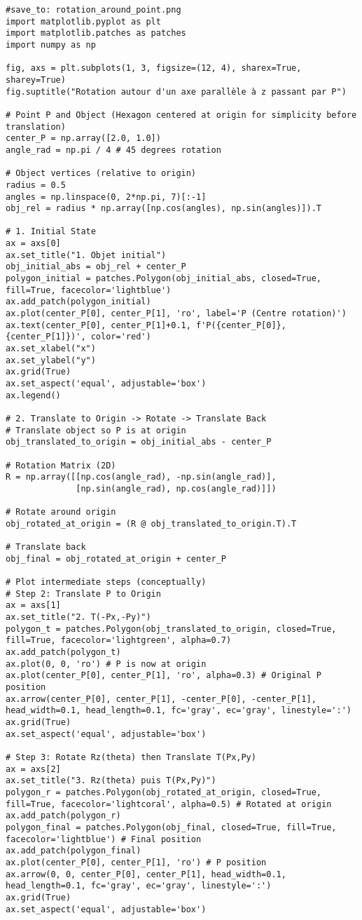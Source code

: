 \documentclass{article}
\begin{document}
\begin{verbatim}
#save_to: rotation_around_point.png
import matplotlib.pyplot as plt
import matplotlib.patches as patches
import numpy as np

fig, axs = plt.subplots(1, 3, figsize=(12, 4), sharex=True, sharey=True)
fig.suptitle("Rotation autour d'un axe parallèle à z passant par P")

# Point P and Object (Hexagon centered at origin for simplicity before translation)
center_P = np.array([2.0, 1.0])
angle_rad = np.pi / 4 # 45 degrees rotation

# Object vertices (relative to origin)
radius = 0.5
angles = np.linspace(0, 2*np.pi, 7)[:-1]
obj_rel = radius * np.array([np.cos(angles), np.sin(angles)]).T

# 1. Initial State
ax = axs[0]
ax.set_title("1. Objet initial")
obj_initial_abs = obj_rel + center_P
polygon_initial = patches.Polygon(obj_initial_abs, closed=True, fill=True, facecolor='lightblue')
ax.add_patch(polygon_initial)
ax.plot(center_P[0], center_P[1], 'ro', label='P (Centre rotation)')
ax.text(center_P[0], center_P[1]+0.1, f'P({center_P[0]},{center_P[1]})', color='red')
ax.set_xlabel("x")
ax.set_ylabel("y")
ax.grid(True)
ax.set_aspect('equal', adjustable='box')
ax.legend()

# 2. Translate to Origin -> Rotate -> Translate Back
# Translate object so P is at origin
obj_translated_to_origin = obj_initial_abs - center_P

# Rotation Matrix (2D)
R = np.array([[np.cos(angle_rad), -np.sin(angle_rad)],
              [np.sin(angle_rad), np.cos(angle_rad)]])

# Rotate around origin
obj_rotated_at_origin = (R @ obj_translated_to_origin.T).T

# Translate back
obj_final = obj_rotated_at_origin + center_P

# Plot intermediate steps (conceptually)
# Step 2: Translate P to Origin
ax = axs[1]
ax.set_title("2. T(-Px,-Py)")
polygon_t = patches.Polygon(obj_translated_to_origin, closed=True, fill=True, facecolor='lightgreen', alpha=0.7)
ax.add_patch(polygon_t)
ax.plot(0, 0, 'ro') # P is now at origin
ax.plot(center_P[0], center_P[1], 'ro', alpha=0.3) # Original P position
ax.arrow(center_P[0], center_P[1], -center_P[0], -center_P[1], head_width=0.1, head_length=0.1, fc='gray', ec='gray', linestyle=':')
ax.grid(True)
ax.set_aspect('equal', adjustable='box')

# Step 3: Rotate Rz(theta) then Translate T(Px,Py)
ax = axs[2]
ax.set_title("3. Rz(theta) puis T(Px,Py)")
polygon_r = patches.Polygon(obj_rotated_at_origin, closed=True, fill=True, facecolor='lightcoral', alpha=0.5) # Rotated at origin
ax.add_patch(polygon_r)
polygon_final = patches.Polygon(obj_final, closed=True, fill=True, facecolor='lightblue') # Final position
ax.add_patch(polygon_final)
ax.plot(center_P[0], center_P[1], 'ro') # P position
ax.arrow(0, 0, center_P[0], center_P[1], head_width=0.1, head_length=0.1, fc='gray', ec='gray', linestyle=':')
ax.grid(True)
ax.set_aspect('equal', adjustable='box')



\end{verbatim}
\end{document}
